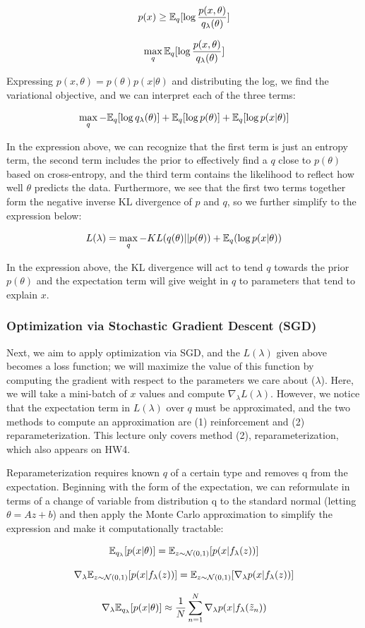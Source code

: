 \documentclass{article}
\begin{document}
$$
p(x) \geq \mathbb{E}_q [\log{\frac{p(x, \theta)}{q_{\lambda}(\theta)}} ]
$$

$$
\max_{q} \mathbb{E}_q [\log{\frac{p(x, \theta)}{q_{\lambda}(\theta)}} ]
$$

Expressing $p(x, \theta) = p(\theta) p(x|\theta)$ and distributing the log, we find the variational objective, and we can interpret each of the three terms:

$$
\max_{q} - \mathbb{E}_q [\log{q_{\lambda}(\theta)} ] + \mathbb{E}_q [\log{p(\theta)} ] + \mathbb{E}_q [\log{p(x|\theta)} ]
$$

In the expression above, we can recognize that the first term is just an entropy term, the second term includes the prior to effectively find a $q$ close to $p(\theta)$ based on cross-entropy, and the third term contains the likelihood to reflect how well $\theta$ predicts the data.  
Furthermore, we see that the first two terms together form the negative inverse KL divergence of $p$ and $q$, so we further simplify to the expression below:

$$
L(\lambda) = \max_{q} - KL(q(\theta) || p(\theta)) + \mathbb{E}_q (\log{p(x|\theta)})
$$

In the expression above, the KL divergence will act to tend $q$ towards the prior $p(\theta)$ and the expectation term will give weight in $q$ to parameters that tend to explain $x$.

\subsubsection{Optimization via Stochastic Gradient Descent (SGD)}

Next, we aim to apply optimization via SGD, and the $L(\lambda)$ given above becomes a loss function; we will maximize the value of this function by computing the gradient with respect to the parameters we care about ($\lambda$).  
Here, we will take a mini-batch of $x$ values and compute $\nabla_{\lambda} L(\lambda)$.  
However, we notice that the expectation term in $L(\lambda)$ over $q$ must be approximated, and the two methods to compute an approximation are (1) reinforcement and (2) reparameterization.
This lecture only covers method (2), reparameterization, which also appears on HW4.

Reparameterization requires known $q$ of a certain type and removes q from the expectation.  
Beginning with the form of the expectation, we can reformulate in terms of a change of variable from distribution q to the standard normal (letting $\theta = Az+b$) and then apply the Monte Carlo approximation to simplify the expression and make it computationally tractable:

$$
\mathbb{E}_{q_{\lambda}} [p(x|\theta)] = \mathbb{E}_{z \sim \mathcal{N}(0,1)} [p(x|f_{\lambda}(z))]
$$

$$
\nabla_{\lambda} \mathbb{E}_{z \sim \mathcal{N}(0,1)} [p(x|f_{\lambda}(z))] = \mathbb{E}_{z \sim \mathcal{N}(0,1)} [ \nabla_{\lambda} p(x|f_{\lambda}(z))]
$$

$$
\nabla_{\lambda} \mathbb{E}_{q_{\lambda}} [p(x|\theta)] \approx \frac{1}{N} \sum_{n=1}^{N} \nabla_{\lambda} p(x|f_{\lambda}(\tilde{z}_n))
$$
\end{document}
